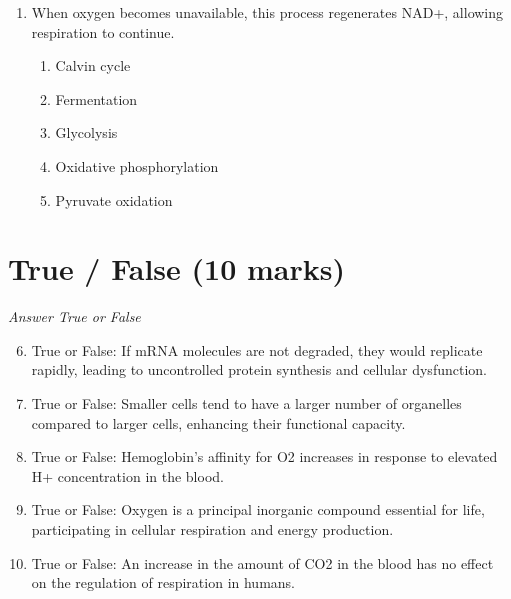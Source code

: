 \documentclass[12pt]{article}
\begin{document}
\begin{enumerate}[label=\arabic*.]
\begin{enumerate}[label=(\alph*)]
    \item The thick muscular wall of the stomach
    \item Antibacterial properties of stomach acid
    \item Gastric juice
    \item High pH levels in the stomach
    \item Presence of beneficial bacteria
\end{enumerate}
\item When oxygen becomes unavailable, this process regenerates NAD+, allowing respiration to
continue.
\begin{enumerate}[label=(\alph*)]
    \item Calvin cycle
    \item Fermentation
    \item Glycolysis
    \item Oxidative phosphorylation
    \item Pyruvate oxidation
\end{enumerate}
\end{enumerate}

\section*{True / False (10 marks)}
\textit{Answer True or False}
\begin{enumerate}[label=\arabic*.]
\setcounter{enumi}{5}
\item True or False: If mRNA molecules are not degraded, they would replicate rapidly, leading to uncontrolled protein synthesis and cellular dysfunction.
\item True or False: Smaller cells tend to have a larger number of organelles compared to larger cells, enhancing their functional capacity.
\item True or False: Hemoglobin's affinity for O2 increases in response to elevated H+ concentration in the blood.
\item True or False: Oxygen is a principal inorganic compound essential for life, participating in cellular respiration and energy production.
\item True or False: An increase in the amount of CO2 in the blood has no effect on the regulation of respiration in humans.
\end{enumerate}
\end{document}
